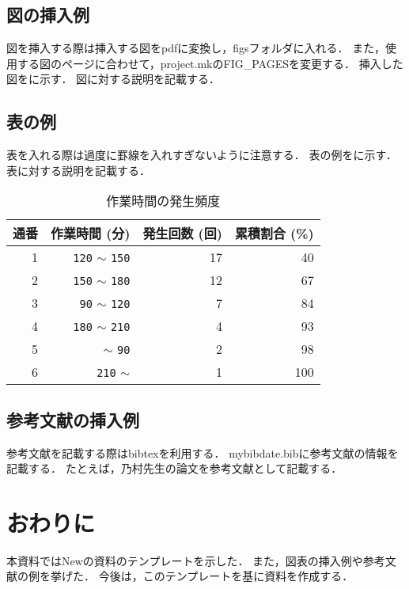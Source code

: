 \documentclass[12pt]{jsarticle}
\begin{document}
\subsection{図の挿入例}
図を挿入する際は挿入する図をpdfに変換し，figsフォルダに入れる．
また，使用する図のページに合わせて，project.mkのFIG\_PAGESを変更する．
挿入した図をに示す．
図に対する説明を記載する．


\subsection{表の例}
表を入れる際は過度に罫線を入れすぎないように注意する．
表の例をに示す．
表に対する説明を記載する．

\begin{table}[tb]
  \begin{center}
    \caption{作業時間の発生頻度}\label{tab:time_range_ratio}
    \begin{tabular}{r|r|r|r}
      \hline\hline
      \multicolumn{1}{l|}{通番} & \multicolumn{1}{l|}{作業時間 (分)} & \multicolumn{1}{l|}{発生回数 (回)} & \multicolumn{1}{l}{累積割合 (\%)}\\
      \hline
      1 & {\texttt{120}} $\sim$ {\texttt{150}} & 17 & 40\\
      2 & {\texttt{150}} $\sim$ {\texttt{180}} & 12 & 67\\
      3 & {\texttt{90}} $\sim$ {\texttt{120}} & 7 & 84\\
      4 & {\texttt{180}} $\sim$ {\texttt{210}} & 4 & 93\\
      5 & $\sim$ {\texttt{90}} & 2 & 98\\
      6 & {\texttt{210}} $\sim$ & 1 & 100\\
      \hline
    \end{tabular}
  \end{center}
\end{table}

\subsection{参考文献の挿入例}
参考文献を記載する際はbibtexを利用する．
mybibdate.bibに参考文献の情報を記載する．
たとえば，乃村先生の論文\cite{nom2011c}を参考文献として記載する．

\section{おわりに}
\label{sec:conclusion}
本資料ではNewの資料のテンプレートを示した．
また，図表の挿入例や参考文献の例を挙げた．
今後は，このテンプレートを基に資料を作成する．



\end{document}
